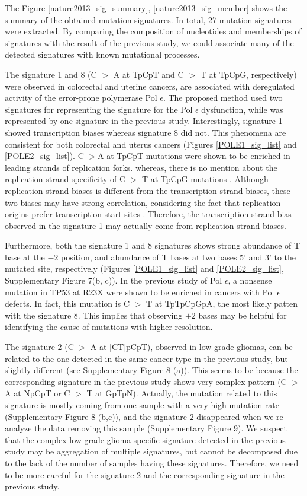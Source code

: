 The Figure \ref{nature2013_sig_summary},  \ref{nature2013_sig_member} shows the summary of the obtained mutation signatures.
In total, 27 mutation signatures were extracted.
By comparing the composition of nucleotides and memberships of signatures with the result of the previous study,
we could associate many of the detected signatures with known mutational processes.



The signature 1 and 8 (C $>$ A at TpCpT and C $>$ T at TpCpG, respectively) were observed in colorectal and uterine cancers,
are associated with deregulated activity of the error-prone polymerase Pol $\epsilon$.
The proposed method used two signatures for representing the signature for the Pol $\epsilon$ dysfunction, 
while was represented by one signature in the previous study.
Interestingly, signature 1 showed transcription biases whereas signature 8 did not.
This phenomena are consistent for both colorectal and uterus cancers (Figures \ref{POLE1_sig_list} and \ref{POLE2_sig_list}).
C $>$A at TpCpT mutations were shown to be enriched in leading strands of replication forks.
whereas, there is no mention about the replication strand-specificity of C $>$ T at TpCpG mutations \cite{pmid25228659}.
Although replication strand biases is different from the transcription strand biases, these two biases may have strong correlation,
considering the fact that replication origins prefer transcription start sites \cite{pmid23187890}.
Therefore, the transcription strand bias observed in the signature 1 may actually come from replication strand biases.

Furthermore, both the signature 1 and 8 signatures shows strong abundance of T base at the $-2$ position,
and abundance of T bases at two bases 5' and 3' to the mutated site, respectively (Figures \ref{POLE1_sig_list} and \ref{POLE2_sig_list}, Supplementary Figure 7(b, c)).
In the previous study of Pol $\epsilon$, a nonsense mutation in TP53 at R23X were shown to be enriched in cancers with Pol $\epsilon$ defects.
In fact, this mutation is C $>$ T at TpTpCpGpA, the most likely patten with the signature 8.
This implies that observing $\pm 2$ bases may be helpful for identifying the cause of mutations with higher resolution.


The signature 2 (C $>$ A at [CT]pCpT), observed in low grade gliomas, 
can be related to the one detected in the same cancer type in the previous study, but slightly different (see Supplementary Figure 8 (a)). 
This seems to be because the corresponding signature in the previous study shows very complex pattern (C $>$ A at NpCpT or C $>$ T at GpTpN).
Actually, the mutation related to this signature is mostly coming from one sample with a very high mutation rate (Supplementary Figure 8 (b,c)), 
and the signature 2 disappeared when we re-analyze the data removing this sample (Supplementary Figure 9).
We suspect that the complex low-grade-glioma specific signature detected in the previous study may be aggregation of multiple signatures,
but cannot be decomposed due to the lack of the number of samples having these signatures.
Therefore, we need to be more careful for the signature 2 and the corresponding signature in the previous study.


